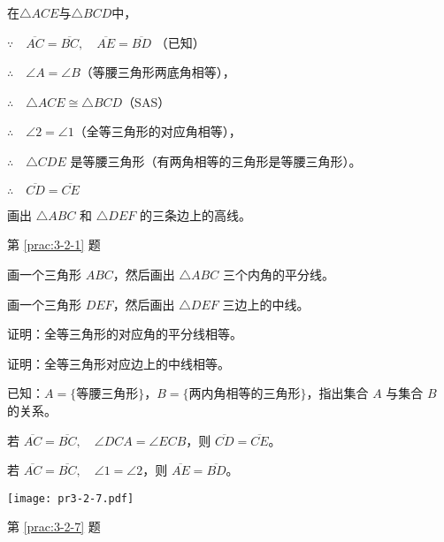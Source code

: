 \begin{solution}
在$\triangle ACE$与$\triangle BCD$中，

$\because\quad \overline{AC}=\overline{BC},\quad \overline{AE}=\overline{BD}$ （已知）

$\therefore\quad \angle A=\angle B$（等腰三角形两底角相等），

$\therefore\quad \triangle ACE\cong \triangle BCD$（SAS）

$\therefore\quad \angle 2=\angle 1$（全等三角形的对应角相等），

$\therefore\quad \triangle CDE$ 是等腰三角形（有两角相等的三角形是等腰三角形）。

$\therefore\quad \overline{CD}=\overline{CE}$
\end{solution}

\begin{Practice}
\begin{question}
\item\label{prac:3-2-1} 画出 $\triangle ABC$ 和 $\triangle DEF$ 的三条边上的高线。
\begin{figurehere}
  \begin{minipage}{\linewidth}\centering
    \caption*{第 \ref{prac:3-2-1} 题}
  \end{minipage}
\end{figurehere}
\item 画一个三角形 $ABC$，然后画出 $\triangle ABC$ 三个内角的平分线。
\item 画一个三角形 $DEF$，然后画出 $\triangle DEF$ 三边上的中线。
\item 证明：全等三角形的对应角的平分线相等。
\item 证明：全等三角形对应边上的中线相等。
\item 已知：$A=\{\text{等腰三角形}\}$，$B=\{\text{两内角相等的三角形}\}$，指出集合 $A$ 与集合 $B$ 的关系。
\item\label{prac:3-2-7} 若 $\overline{AC}=\overline{BC},\quad \angle DCA=\angle ECB$，则 $\overline{CD}=\overline{CE}$。
\item\label{prac:3-2-8} 若 $\overline{AC}=\overline{BC},\quad \angle 1=\angle 2$，则 $\overline{AE}=\overline{BD}$。
\begin{figurehere}
  \begin{minipage}[b]{0.45\linewidth}\centering
    \texttt{[image: pr3-2-7.pdf]}
    \caption*{第 \ref{prac:3-2-7} 题}
  \end{minipage}
  \begin{minipage}[b]{0.45\linewidth}\centering

\end{minipage}
\end{figurehere}
\end{question}
\end{Practice}
